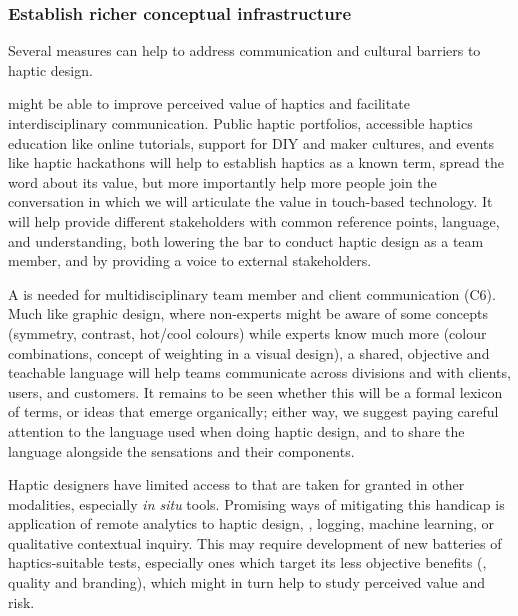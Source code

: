     
\subsubsection{Establish richer conceptual infrastructure}
\noindent
Several measures can help to address communication and cultural barriers to haptic design. %

     might be able to improve perceived value of haptics and facilitate interdisciplinary communication. %
    Public haptic portfolios, accessible haptics education \citep{Jones2014} like online tutorials, support for DIY and maker cultures, and events like haptic hackathons \citep{madelska2015news} will help to establish haptics as a known term, spread the word about its value, but more importantly help more people join the conversation in which we will articulate %
    the value in touch-based technology.
    It will help provide different stakeholders with common reference points, language, and understanding, both lowering the bar to conduct haptic design as a team member, and by providing a voice to external stakeholders.
    
    
    A  is needed for multidisciplinary team member and client communication (C6).
    Much like graphic design, where non-experts might be aware of some concepts (symmetry, contrast, hot/cool colours) 
    while experts know much more (colour combinations, concept of weighting in a visual design), 
    a shared, objective and teachable language will help teams communicate across divisions and with clients, users, and customers.
    It remains to be seen whether this will be a formal lexicon of terms, or ideas that emerge organically; either way, we suggest paying careful attention to the language used when doing haptic design, and to share the language alongside the sensations and their components.
    
    
    Haptic designers have limited access to  that are taken for granted in other modalities, especially \emph{in situ} tools.
    Promising ways of mitigating this handicap is application of remote analytics to haptic design, \eg, logging, machine learning, or qualitative contextual inquiry.
    This may require development of new batteries of haptics-suitable tests, especially ones which target its less objective benefits (\eg, quality and branding), which might in turn help to study perceived value and risk.


